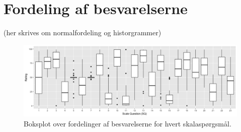 \section{Fordeling af besvarelserne}
\label{TestAfSkalaFordeling}
%
(her skrives om normalfordeling og historgrammer)

\begin{figure}[H]
\centering
\includegraphics[width = \textwidth]{Figure/DatabehandlingSkalaer/boksplot0er} 
\caption{Boksplot over fordelinger af besvarelserne for hvert skalaspørgsmål.}
\label{fig:boksplots}
\end{figure}
\noindent
%


